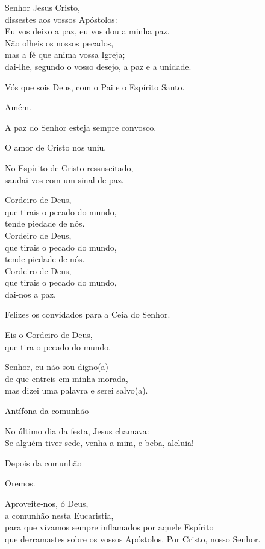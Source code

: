 \documentclass{book}
\begin{document}
\begin{flushleft}
    Senhor Jesus Cristo, \\
    dissestes aos vossos Apóstolos: \\
    Eu vos deixo a paz, eu vos dou a minha paz. \\
    Não olheis os nossos pecados, \\
    mas a fé que anima vossa Igreja; \\
    dai-lhe, segundo o vosso desejo, a paz e a unidade.

    Vós que sois Deus, com o Pai e o Espírito Santo.

    Amém.

    A paz do Senhor esteja sempre convosco.

    O amor de Cristo nos uniu.

    No Espírito de Cristo ressuscitado, \\
    saudai-vos com um sinal de paz.

    Cordeiro de Deus, \\
    que tirais o pecado do mundo, \\
    tende piedade de nós. \\
    Cordeiro de Deus, \\
    que tirais o pecado do mundo, \\
    tende piedade de nós. \\
    Cordeiro de Deus, \\
    que tirais o pecado do mundo, \\
    dai-nos a paz.

    Felizes os convidados para a Ceia do Senhor.

    Eis o Cordeiro de Deus, \\
    que tira o pecado do mundo.

    Senhor, eu não sou digno(a) \\
    de que entreis em minha morada, \\
    mas dizei uma palavra e serei salvo(a).

    Antífona da comunhão

    No último dia da festa, Jesus chamava: \\
    Se alguém tiver sede, venha a mim, e beba, aleluia!

    Depois da comunhão

    Oremos.

    Aproveite-nos, ó Deus, \\
    a comunhão nesta Eucaristia, \\
    para que vivamos sempre inflamados por aquele Espírito \\
    que derramastes sobre os vossos Apóstolos.
    Por Cristo, nosso Senhor.


\end{flushleft}
\end{document}
